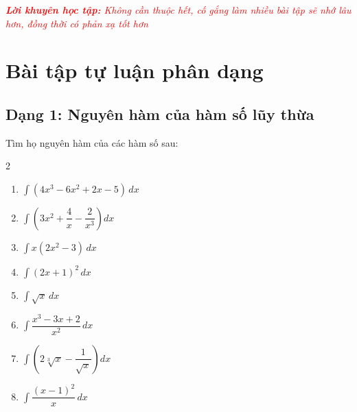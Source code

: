 \documentclass[12pt]{article}
\begin{document}
	\vspace{0.5cm}
	\begin{center}
		\textcolor{red}{\textit{\textbf{Lời khuyên học tập:} Không cần thuộc hết, cố gắng làm nhiều bài tập sẽ nhớ lâu hơn, đồng thời có phản xạ tốt hơn}}
	\end{center}
	
	
	
	\newpage
	
	\section{Bài tập tự luận phân dạng}
	
	\subsection{Dạng 1: Nguyên hàm của hàm số lũy thừa}
	
	\begin{btxanh}
		Tìm họ nguyên hàm của các hàm số sau:
		\begin{multicols}{2}
			\begin{enumerate}[label=\alph*)]
				\item $\displaystyle \int (4x^3 - 6x^2 + 2x - 5) \,dx$
				\item $\displaystyle \int \left( 3x^2 + \dfrac{4}{x} - \dfrac{2}{x^3} \right) dx$
				\item $\displaystyle \int x(2x^2 - 3) \,dx$
				\item $\displaystyle \int (2x + 1)^2 \,dx$
				\item $\displaystyle \int \sqrt{x} \,dx$
				\item $\displaystyle \int \dfrac{x^3 - 3x + 2}{x^2} \,dx$
				\item $\displaystyle \int \left( 2\sqrt[3]{x} - \dfrac{1}{\sqrt{x}} \right) dx$
				\item $\displaystyle \int \dfrac{(x-1)^2}{x} \,dx$
			\end{enumerate}
		\end{multicols}
	\end{btxanh}
	
\end{document}
